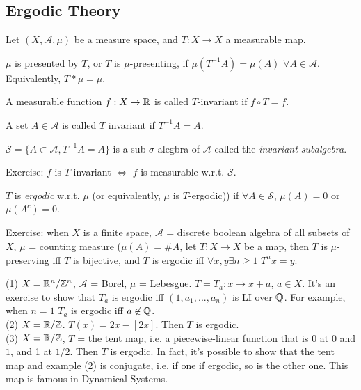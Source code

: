 \documentclass[a4paper]{article}
\begin{document}
\subsection{Ergodic Theory}
Let $(X,\mathcal{A},\mu)$ be a measure space, and $T:X \to X$ a measurable map.

\begin{defi}
$\mu$ is presented by $T$, or $T$ is $\mu$-presenting, if $\mu(T^{-1}A) = \mu(A)$ $\forall A \in \mathcal{A}$. Equivalently, $T * \mu = \mu$.
\end{defi}

\begin{defi}
A measurable function $f:X \to \mathbb{R}$ is called $T$-invariant if $f \circ T = f$.
\end{defi}

\begin{defi}
A set $A \in \mathcal{A}$ is called $T$ invariant if $T^{-1}A = A$.
\end{defi}

\begin{defi}
$\mathscr{S} = \{A \subset \mathcal{A}, T^{-1}A = A\}$ is a sub-$\sigma$-alegbra of $\mathcal{A}$ called the \emph{invariant subalgebra}.
\end{defi}

Exercise: $f$ is $T$-invariant $\iff$ $f$ is measurable w.r.t. $\mathscr{S}$.

\begin{defi}
$T$ is \emph{ergodic} w.r.t. $\mu$ (or equivalently, $\mu$ is $T$-ergodic)) if $\forall A \in \mathscr{S}$, $\mu(A) = 0$ or $\mu(A^c) =0$.
\end{defi}

Exercise: when $X$ is a finite space, $\mathcal{A}$ = discrete boolean algebra of all subsets of $X$, $\mu$ = counting measure ($\mu(A) = \# A$, let $T:X \to X$ be a map, then $T$ is $\mu$-preserving iff $T$ is bijective, and $T$ is ergodic iff $\forall x,y \exists n \geq 1$ $T^n x = y$.

\begin{eg}
(1) $X =\mathbb{R}^n / \mathbb{Z}^n$, $\mathcal{A}$ = Borel, $\mu$ = Lebesgue. $T=T_a:x \to x+a$, $a \in X$. It's an exercise to show that $T_a$ is ergodic iff $(1,a_1,...,a_n)$ is LI over $\mathbb{Q}$. For example, when $n=1$ $T_a$ is ergodic iff $a \not\in \mathbb{Q}$.\\
(2) $X =\mathbb{R} / \mathbb{Z}$. $T(x) = 2x - [2x]$. Then $T$ is ergodic.\\
(3) $X =\mathbb{R} / \mathbb{Z}$, $T$ = the tent map, i.e. a piecewise-linear function that is 0 at $0$ and $1$, and 1 at $1/2$. Then $T$ is ergodic. In fact, it's possible to show that the tent map and example (2) is conjugate, i.e. if one if ergodic, so is the other one. This map is famous in Dynamical Systems.
\end{eg}
\end{document}
